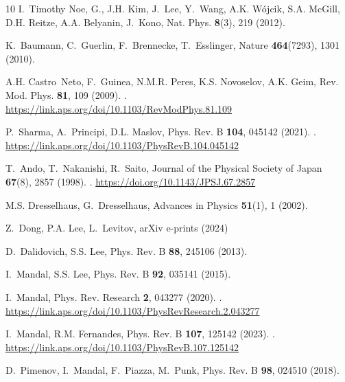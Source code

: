 \begin{thebibliography}{10}
I.~{Timothy Noe}, G., J.H. {Kim}, J.~{Lee}, Y.~{Wang}, A.K. {W{\'o}jcik}, S.A.
  {McGill}, D.H. {Reitze}, A.A. {Belyanin}, J.~{Kono}, Nat. Phys.
  \textbf{8}(3), 219 (2012).
\newblock {}

K.~{Baumann}, C.~{Guerlin}, F.~{Brennecke}, T.~{Esslinger}, Nature
  \textbf{464}(7293), 1301 (2010).
\newblock {}

A.H. Castro~Neto, F.~Guinea, N.M.R. Peres, K.S. Novoselov, A.K. Geim, Rev. Mod.
  Phys. \textbf{81}, 109 (2009).
\newblock {}.
\newblock \urlprefix\url{https://link.aps.org/doi/10.1103/RevModPhys.81.109}

P.~Sharma, A.~Principi, D.L. Maslov, Phys. Rev. B \textbf{104}, 045142 (2021).
\newblock {}.
\newblock \urlprefix\url{https://link.aps.org/doi/10.1103/PhysRevB.104.045142}

T.~Ando, T.~Nakanishi, R.~Saito, Journal of the Physical Society of Japan
  \textbf{67}(8), 2857 (1998).
\newblock {}.
\newblock \urlprefix\url{https://doi.org/10.1143/JPSJ.67.2857}

M.S. {Dresselhaus}, G.~{Dresselhaus}, Advances in Physics \textbf{51}(1), 1
  (2002).
\newblock {}

Z.~{Dong}, P.A. {Lee}, L.~{Levitov}, arXiv e-prints  (2024)

D.~Dalidovich, S.S. Lee, Phys. Rev. B \textbf{88}, 245106 (2013).
\newblock {}

I.~Mandal, S.S. Lee, Phys. Rev. B \textbf{92}, 035141 (2015).
\newblock {}

I.~Mandal, Phys. Rev. Research \textbf{2}, 043277 (2020).
\newblock {}.
\newblock
  \urlprefix\url{https://link.aps.org/doi/10.1103/PhysRevResearch.2.043277}

I.~Mandal, R.M. Fernandes, Phys. Rev. B \textbf{107}, 125142 (2023).
\newblock {}.
\newblock \urlprefix\url{https://link.aps.org/doi/10.1103/PhysRevB.107.125142}

D.~Pimenov, I.~Mandal, F.~Piazza, M.~Punk, Phys. Rev. B \textbf{98}, 024510
  (2018).
\newblock {}


\end{thebibliography}
